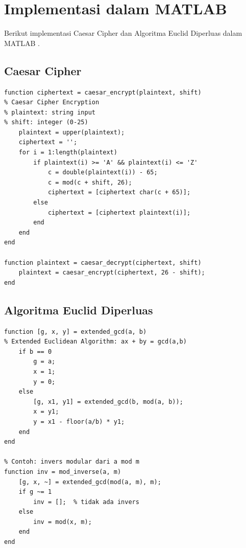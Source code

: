 \section{Implementasi dalam MATLAB}

Berikut implementasi Caesar Cipher dan Algoritma Euclid Diperluas dalam MATLAB \cite{ferguson2010,schneier1996}.

\subsection{Caesar Cipher}
\begin{lstlisting}[style=matlab,caption={Implementasi Caesar Cipher dalam MATLAB}]
function ciphertext = caesar_encrypt(plaintext, shift)
% Caesar Cipher Encryption
% plaintext: string input
% shift: integer (0-25)
    plaintext = upper(plaintext);
    ciphertext = '';
    for i = 1:length(plaintext)
        if plaintext(i) >= 'A' && plaintext(i) <= 'Z'
            c = double(plaintext(i)) - 65;
            c = mod(c + shift, 26);
            ciphertext = [ciphertext char(c + 65)];
        else
            ciphertext = [ciphertext plaintext(i)];
        end
    end
end

function plaintext = caesar_decrypt(ciphertext, shift)
    plaintext = caesar_encrypt(ciphertext, 26 - shift);
end
\end{lstlisting}

\subsection{Algoritma Euclid Diperluas}
\begin{lstlisting}[style=matlab,caption={Extended Euclidean Algorithm dalam MATLAB}]
function [g, x, y] = extended_gcd(a, b)
% Extended Euclidean Algorithm: ax + by = gcd(a,b)
    if b == 0
        g = a;
        x = 1;
        y = 0;
    else
        [g, x1, y1] = extended_gcd(b, mod(a, b));
        x = y1;
        y = x1 - floor(a/b) * y1;
    end
end

% Contoh: invers modular dari a mod m
function inv = mod_inverse(a, m)
    [g, x, ~] = extended_gcd(mod(a, m), m);
    if g ~= 1
        inv = [];  % tidak ada invers
    else
        inv = mod(x, m);
    end
end
\end{lstlisting}
